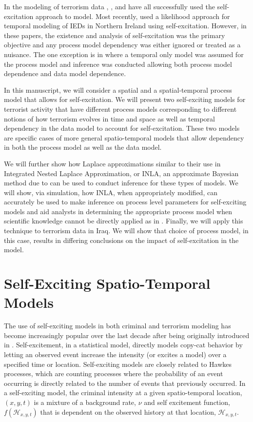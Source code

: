 \documentclass[11pt]{isuthesis}
\begin{document}
In the modeling of terrorism data \cite{lewis2012self}, \cite{porter2012self}, and \cite{mohler2013modeling} have all successfully used the self-excitation approach to model.  Most recently, \cite{tench2016spatio} used a likelihood approach for temporal modeling of IEDs in Northern Ireland using self-excitation.  However, in these papers, the existence and analysis of self-excitation was the primary objective and any process model dependency was either ignored or treated as a nuisance.  The one exception is in \cite{mohler2013modeling} where a temporal only model was assumed for the process model and inference was conducted allowing both process model dependence and data model dependence.

In this manuscript, we will consider a spatial and a spatial-temporal process model that allows for self-excitation.  We will present two self-exciting models for terrorist activity that have different process models corresponding to different notions of how terrorism evolves in time and space as well as temporal dependency in the data model to account for self-excitation.  These two models are specific cases of more general spatio-temporal models that allow dependency in both the process model as well as the data model.

We will further show how Laplace approximations similar to their use in Integrated Nested Laplace Approximation, or INLA, an approximate Bayesian method due to \cite{rue2009approximate} can be used to conduct inference for these types of models. We will show, via simulation, how INLA, when appropriately modified, can accurately be used to make inference on process level parameters for self-exciting models and aid analysts in determining the appropriate process model when scientific knowledge cannot be directly applied as in \cite{cressie2015statistics}.  Finally, we will apply this technique to terrorism data in Iraq.  We will show that choice of process model, in this case, results in differing conclusions on the impact of self-excitation in the model.  


\section{Self-Exciting Spatio-Temporal Models}
The use of self-exciting models in both criminal and terrorism modeling has become increasingly popular over the last decade after being originally introduced in \cite{short2008statistical}.  Self-excitement, in a statistical model, directly models copy-cat behavior by letting an observed event increase the intensity (or excites a model) over a specified time or location. Self-exciting models are closely related to Hawkes processes, which are counting processes where the probability of an event occurring is directly related to the number of events that previously occurred. In a self-exciting model, the criminal intensity at a given spatio-temporal location, $(x,y,t)$ is a mixture of a background rate, $\nu$ and self excitement function, $f(\mathcal{H}_{x,y,t})$ that is dependent on the observed history at that location, $\mathcal{H}_{x,y,t}$.  
\end{document}
